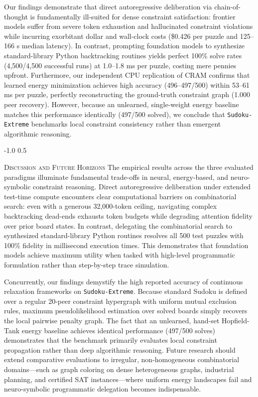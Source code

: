 \documentclass{article} %
\makeatletter
\renewcommand{\subsection}{\@startsection{subsection}{2}{\z@}%
  {-1.0\baselineskip}%
  {0.5\baselineskip}%
  {\normalfont\fontsize{10pt}{12pt}\selectfont\scshape\raggedright}}
\makeatother
\begin{document}
Our findings demonstrate that direct autoregressive deliberation via chain-of-thought is fundamentally ill-suited for dense constraint satisfaction: frontier models suffer from severe token exhaustion and hallucinated constraint violations while incurring exorbitant dollar and wall-clock costs (\$0.426 per puzzle and 125--166 s median latency). In contrast, prompting foundation models to synthesize standard-library Python backtracking routines yields perfect 100\% solve rates (4,500/4,500 successful runs) at 1.0--1.8 ms per puzzle, costing mere pennies upfront. Furthermore, our independent CPU replication of CRAM confirms that learned energy minimization achieves high accuracy (496--497/500) within 53--61 ms per puzzle, perfectly reconstructing the ground-truth constraint graph (1.000 peer recovery). However, because an unlearned, single-weight energy baseline matches this performance identically (497/500 solved), we conclude that \texttt{Sudoku-Extreme} benchmarks local constraint consistency rather than emergent algorithmic reasoning.

\subsection{\textsc{Discussion and Future Horizons}}
The empirical results across the three evaluated paradigms illuminate fundamental trade-offs in neural, energy-based, and neuro-symbolic constraint reasoning. Direct autoregressive deliberation under extended test-time compute encounters clear computational barriers on combinatorial search: even with a generous 32,000-token ceiling, navigating complex backtracking dead-ends exhausts token budgets while degrading attention fidelity over prior board states. In contrast, delegating the combinatorial search to synthesized standard-library Python routines resolves all 500 test puzzles with 100\% fidelity in millisecond execution times. This demonstrates that foundation models achieve maximum utility when tasked with high-level programmatic formulation rather than step-by-step trace simulation.

Concurrently, our findings demystify the high reported accuracy of continuous relaxation frameworks on \texttt{Sudoku-Extreme}. Because standard Sudoku is defined over a regular 20-peer constraint hypergraph with uniform mutual exclusion rules, maximum pseudolikelihood estimation over solved boards simply recovers the local pairwise penalty graph. The fact that an unlearned, hand-set Hopfield-Tank energy baseline achieves identical performance (497/500 solves) demonstrates that the benchmark primarily evaluates local constraint propagation rather than deep algorithmic reasoning. Future research should extend comparative evaluations to irregular, non-homogeneous combinatorial domains—such as graph coloring on dense heterogeneous graphs, industrial planning, and certified SAT instances—where uniform energy landscapes fail and neuro-symbolic programmatic delegation becomes indispensable.
\end{document}
